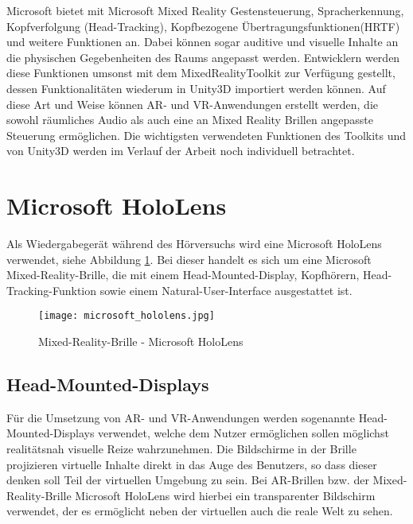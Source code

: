 Microsoft bietet mit Microsoft Mixed Reality Gestensteuerung, Spracherkennung, Kopfverfolgung (Head-Tracking), Kopfbezogene Übertragungsfunktionen(HRTF) und weitere Funktionen an. Dabei können sogar auditive und visuelle Inhalte an die physischen Gegebenheiten des Raums angepasst werden. Entwicklern werden diese Funktionen umsonst mit dem MixedRealityToolkit zur Verfügung gestellt, dessen Funktionalitäten wiederum in Unity3D importiert werden können. Auf diese Art und Weise können AR- und VR-Anwendungen erstellt werden, die sowohl räumliches Audio als auch eine an Mixed Reality Brillen angepasste Steuerung ermöglichen. Die wichtigsten verwendeten Funktionen des Toolkits und von Unity3D werden im Verlauf der Arbeit noch individuell betrachtet.

\newpage

\section{Microsoft HoloLens}
Als Wiedergabegerät während des Hörversuchs wird eine Microsoft HoloLens verwendet, siehe Abbildung \ref{fig:microsoft_hololens}. Bei dieser handelt es sich um eine Microsoft Mixed-Reality-Brille, die mit einem Head-Mounted-Display, Kopfhörern, Head-Tracking-Funktion sowie einem Natural-User-Interface ausgestattet ist.

 \begin{figure}[H]
\centering
\texttt{[image: microsoft\_hololens.jpg]}
\caption{Mixed-Reality-Brille - Microsoft HoloLens}
\label{fig:microsoft_hololens}
\end{figure}

\subsection{Head-Mounted-Displays}
Für die Umsetzung von AR- und VR-Anwendungen werden sogenannte Head-Mounted-Displays verwendet, welche dem Nutzer ermöglichen sollen möglichst realitätsnah visuelle Reize wahrzunehmen. Die Bildschirme in der Brille projizieren virtuelle Inhalte direkt in das Auge des Benutzers, so dass dieser denken soll Teil der virtuellen Umgebung zu sein. Bei AR-Brillen bzw. der Mixed-Reality-Brille Microsoft HoloLens wird hierbei ein transparenter Bildschirm verwendet, der es ermöglicht neben der virtuellen auch die reale Welt zu sehen.\\


